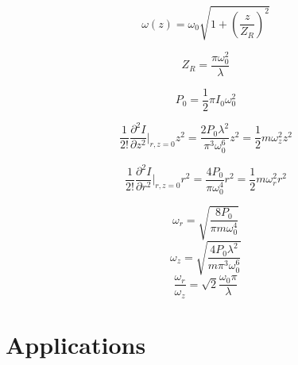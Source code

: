 \documentclass{article}
\newcommand{\p}{\partial}
\begin{document}
\[ \omega(z) = \omega_0 \sqrt{1 + \left( \frac{z}{Z_R} \right)^2} \]

\[ Z_R = \frac{\pi\omega_0^2}{\lambda}  \]

\[ P_0 = \frac{1}{2} \pi I_0\omega_0^2 \]

\[ \frac{1}{2!}\frac{\p^2I}{\p z^2} \Bigg\vert_{r,z=0} z^2 = \frac{2P_0\lambda^2}{\pi^3\omega_0^6}z^2 = \frac{1}{2}m\omega_z^2z^2  \]

\[ \frac{1}{2!}\frac{\p^2I}{\p r^2} \Bigg\vert_{r,z=0} r^2 = \frac{4P_0}{\pi\omega_0^4}r^2 = \frac{1}{2}m\omega_r^2r^2  \]

\[ \omega_r = \sqrt{\frac{8P_0}{\pi m\omega_0^4}} \]
\[ \omega_z = \sqrt{\frac{4P_0\lambda^2}{m\pi^3\omega_0^6}} \]
\[ \frac{\omega_r}{\omega_z} = \sqrt{2}\frac{\omega_0\pi}{\lambda}  \]





\section*{Applications}

\cite{DoS}

\newpage



\end{document}

